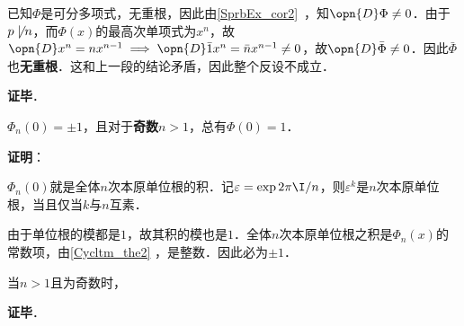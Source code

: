 已知$\Phi$是可分多项式，无重根，因此由\autoref{SprbEx_cor2}~，知$\opn{D}\Phi\neq 0$．由于$p\not\mid n$，而$\Phi(x)$的最高次单项式为$x^n$，故$\opn{D}x^n=nx^{n-1}\implies \opn{D} \bar{1}x^n=\bar{n}x^{n-1}\neq 0$，故$\opn{D}\bar{\Phi}\neq 0$．因此$\bar{\Phi}$也\textbf{无重根}．这和上一段的结论矛盾，因此整个反设不成立．

\textbf{证毕}．



\begin{theorem}{}
$\Phi_n(0)=\pm 1$，且对于\textbf{奇数}$n>1$，总有$\Phi(0)=1$．
\end{theorem}

\textbf{证明}：

$\Phi_n(0)$就是全体$n$次本原单位根的积．记$\varepsilon=\exp{2\pi\I/n}$，则$\varepsilon^k$是$n$次本原单位根，当且仅当$k$与$n$互素．

由于单位根的模都是$1$，故其积的模也是$1$．全体$n$次本原单位根之积是$\Phi_n(x)$的常数项，由\autoref{Cycltm_the2} ，是整数．因此必为$\pm 1$．

当$n>1$且为奇数时，

\textbf{证毕}．





























